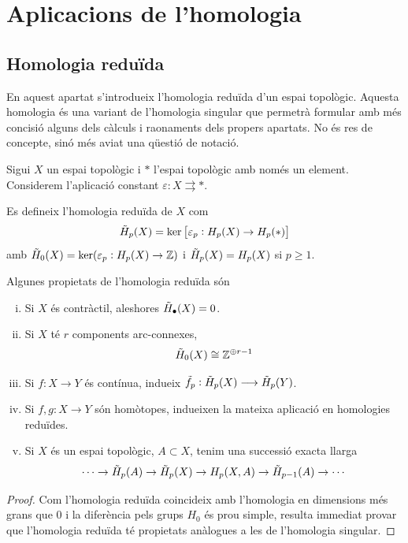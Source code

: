 \documentclass[../main.tex]{subfiles}
\begin{document}
\chapter{Aplicacions de l'homologia}



\section{Homologia reduïda}

En aquest apartat s'introdueix l'homologia reduïda d'un espai topològic. Aquesta homologia és una variant de l'homologia singular que permetrà formular amb més concisió alguns dels càlculs i raonaments dels propers apartats. No és res de concepte, sinó més aviat una qüestió de notació.

Sigui $X$ un espai topològic i $*$ l'espai topològic amb només un element. Considerem l'aplicació constant $\varepsilon:X\rightrightarrows *$.
\begin{defi}
 Es defineix l'homologia reduïda de $X$ com
\begin{equation}
    \notag
    \Tilde{H}_p(X) = \ker\left[\varepsilon_p:H_p(X)\rightarrow H_p(*)\right]
\end{equation}
amb $\Tilde{H}_0(X) = \ker(\varepsilon_p:H_p(X)\rightarrow \mathbb{Z})$ i $\Tilde{H}_p(X) = H_p(X)$ si $p\geq 1$.
\end{defi}

\begin{prop}
Algunes propietats de l'homologia reduïda són
\begin{enumerate}[(i)]
    \item Si $X$ és contràctil, aleshores $\Tilde{H}_\bullet(X) = 0$.
    \item Si $X$ té $r$ components arc-connexes,
    \begin{equation}
        \notag
        \Tilde{H}_0(X)\cong\mathbb{Z}^{\oplus r-1}
    \end{equation}
    \item Si $f:X\rightarrow Y$ és contínua, indueix $\Tilde{f}_p:\Tilde{H}_p(X)\longrightarrow \Tilde{H}_p(Y)$.
    \item Si $f,g:X\rightarrow Y$ són homòtopes, indueixen la mateixa aplicació en homologies reduïdes.
    \item Si $X$ és un espai topològic, $A\subset X$, tenim una successió exacta llarga
    \begin{equation}
        \notag
        \cdots \rightarrow \Tilde{H}_p(A)\rightarrow \Tilde{H}_p(X)\rightarrow H_p(X,A)\rightarrow \Tilde{H}_{p-1}(A)\rightarrow\cdots
    \end{equation}
\end{enumerate}
\end{prop}
\begin{proof}
Com l'homologia reduïda coincideix amb l'homologia en dimensions més grans que $0$ i la diferència pels grups $H_0$ és prou simple, resulta immediat provar que l'homologia reduïda té propietats anàlogues a les de l'homologia singular.
\end{proof}
\end{document}
